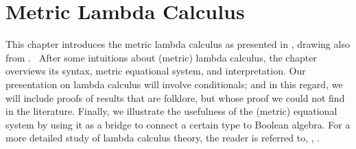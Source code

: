 


  


   



















\chapter{Metric Lambda Calculus} \label{ch:metriclambda}




This chapter introduces the metric lambda calculus as presented in \cite{dahlqvist2023syntactic}, drawing also from \cite{mackieLanguageAutonomous1993,croleCategoriesTypes1994,selinger2013lecture}.  After some intuitions about (metric) lambda calculus, the chapter overviews its syntax, metric equational system, and interpretation. %
Our presentation on lambda calculus will involve conditionals; and in this regard, we will include proofs of results that are folklore, but whose proof we could not find in the literature. Finally, we illustrate the usefulness of the (metric) equational system by using it as a bridge to connect a certain type to Boolean algebra.  
For a more detailed study of lambda calculus theory, the reader is referred to, \eg, \cite{barendregt1984lambda}. 

